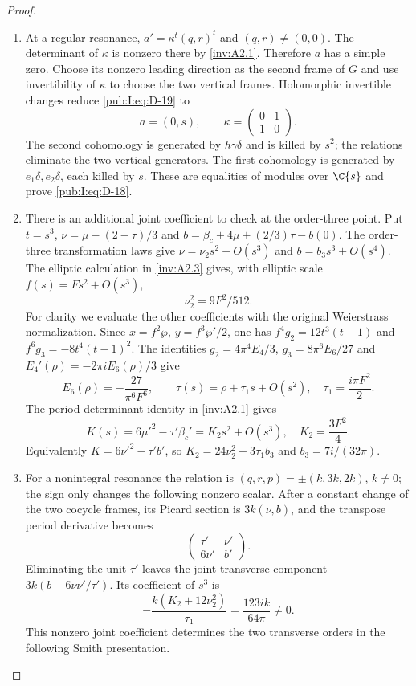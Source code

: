 \begin{proof}
\begin{enumerate}[label=\arabic*.,leftmargin=*]
\item At a regular resonance, $a'=\kappa^t(q,r)^t$ and
$(q,r)\ne(0,0)$. The determinant of $\kappa$ is nonzero there by
\cref{inv:A2.1}. Therefore $a$ has a simple zero. Choose its nonzero leading
direction as the second frame of $G$ and use invertibility of
$\kappa$ to choose the two vertical frames. Holomorphic invertible
changes reduce \eqref{pub:I:eq:D-19} to
\begin{equation}
 a=(0,s),\qquad \kappa=\begin{pmatrix}0&1\\1&0\end{pmatrix}.
\label{pub:I:eq:D-21}
\end{equation}
The second cohomology is generated by $h\gamma\delta$ and is killed
by $s^2$; the relations eliminate the two vertical generators.
The first cohomology is generated by $e_1\delta,e_2\delta$, each
killed by $s$. These are equalities of modules over $\C\{s\}$
and prove \eqref{pub:I:eq:D-18}.

\item There is an additional joint coefficient to check at the order-three
point. Put $t=s^3$, $\nu=\mu-(2-\tau)/3$ and
$b=\beta_c+4\mu+(2/3)\tau-b(0)$. The order-three transformation
laws give $\nu=\nu_2s^2+O(s^3)$ and $b=b_3s^3+O(s^4)$.
The elliptic calculation in \ref{inv:A2.3} gives, with elliptic scale
$f(s)=F s^2+O(s^3)$,
\[
 \nu_2^2=9F^2/512.
\]
For clarity we evaluate the other coefficients with the original
Weierstrass normalization. Since $x=f^2\wp$,
$y=f^3\wp'/2$, one has
$f^4g_2=12t^3(t-1)$ and $f^6g_3=-8t^4(t-1)^2$.
The identities $g_2=4\pi^4E_4/3$, $g_3=8\pi^6E_6/27$ and
$E_4'(\rho)=-2\pi iE_6(\rho)/3$ give
\[
 E_6(\rho)=-\frac{27}{\pi^6F^6},\qquad
 \tau(s)=\rho+\tau_1s+O(s^2),\quad \tau_1=\frac{i\pi F^2}{2}.
\]
The period determinant identity in \cref{inv:A2.1} gives
\[
 K(s)=6\mu'^2-\tau'\beta_c'=K_2s^2+O(s^3),
 \quad K_2=\frac{3F^2}{4}.
\]
Equivalently $K=6\nu'^2-\tau'b'$, so
$K_2=24\nu_2^2-3\tau_1b_3$ and $b_3=7i/(32\pi)$.

\item For a nonintegral resonance the relation is
$(q,r,p)=\pm(k,3k,2k)$, $k\ne0$; the sign only changes the
following nonzero scalar. After a constant change of the two
cocycle frames, its Picard section is $3k(\nu,b)$, and the
transpose period derivative becomes
\[
 \begin{pmatrix}\tau'&\nu'\\6\nu'&b'\end{pmatrix}.
\]
Eliminating the unit $\tau'$ leaves the joint transverse component
$3k(b-6\nu\nu'/\tau')$. Its coefficient of $s^3$ is
\begin{equation}
 -\frac{k(K_2+12\nu_2^2)}{\tau_1}
       =\frac{123ik}{64\pi}\ne0.
\label{pub:I:eq:D-22}
\end{equation}
This nonzero joint coefficient determines the two transverse
orders in the following Smith presentation.


\end{enumerate}
\end{proof}
